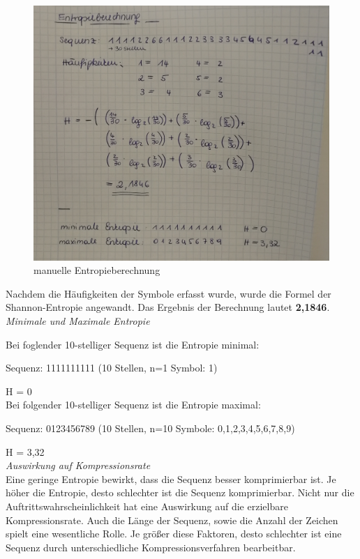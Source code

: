 \documentclass[12pt,german]{article}
\begin{document}
\begin{figure}[H]
	\centering
	\includegraphics[width=12cm]{images/entropieBerechnung.jpg}
	\caption{manuelle Entropieberechnung}
	\label{fig:resultEntropie}
\end{figure}

Nachdem die Häufigkeiten der Symbole erfasst wurde, wurde die Formel der Shannon-Entropie angewandt. Das Ergebnis der Berechnung lautet \textbf{2,1846}. \\

\textit{Minimale und Maximale Entropie}

Bei foglender 10-stelliger Sequenz ist die Entropie minimal:

Sequenz: 1111111111 (10 Stellen, n=1 Symbol: 1)

H = 0\\

Bei folgender 10-stelliger Sequenz ist die Entropie maximal:

Sequenz: 0123456789 (10 Stellen, n=10 Symbole: 0,1,2,3,4,5,6,7,8,9)

H = 3,32\\

\textit{Auswirkung auf Kompressionsrate}\\

Eine geringe Entropie bewirkt, dass die Sequenz besser komprimierbar ist.  Je höher die Entropie, desto schlechter ist die Sequenz komprimierbar. Nicht nur die Auftrittswahrscheinlichkeit hat eine Auswirkung auf die erzielbare Kompressionsrate. Auch die Länge der Sequenz, sowie die Anzahl der Zeichen spielt eine wesentliche Rolle. Je größer diese Faktoren, desto schlechter ist eine Sequenz durch unterschiedliche Kompressionsverfahren bearbeitbar.
\end{document}
